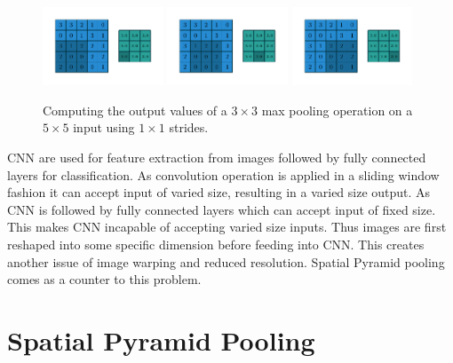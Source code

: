 \begin{figure}
    \includegraphics[width=0.32\textwidth]{pdf/numerical_max_pooling_06.pdf}
    \includegraphics[width=0.32\textwidth]{pdf/numerical_max_pooling_07.pdf}
    \includegraphics[width=0.32\textwidth]{pdf/numerical_max_pooling_08.pdf}
    \caption{\label{fig:numerical_max_pooling} Computing the output values of a
        $3 \times 3$ max pooling operation on a $5 \times 5$ input using $1
        \times 1$ strides.}
\end{figure}

CNN are used for feature extraction from images followed by fully connected layers for classification. As convolution operation is applied in a sliding window fashion it can accept input of varied size, resulting in a varied size output. As CNN is followed by fully connected layers which can accept input of fixed size. This makes CNN incapable of accepting varied size inputs. Thus images are first reshaped into some specific dimension before feeding into CNN. This creates another issue of image warping and reduced resolution. Spatial Pyramid pooling comes as a counter to this problem.

\section{Spatial Pyramid Pooling}

